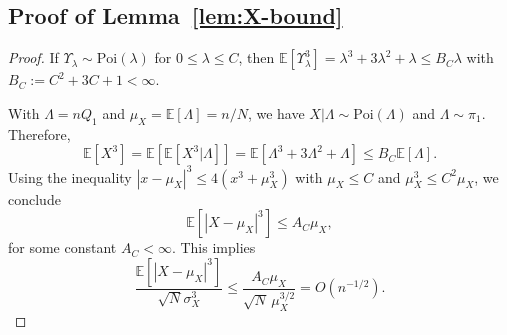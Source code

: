 \documentclass[11pt]{article}
\numberwithin{equation}{section}
\newcommand{\Pois}{\mathrm{Poi}}
\newcommand{\ex}[1]{\ensuremath{\mathbb{E}\left[ #1\right]}}
\begin{document}
\subsection{Proof of Lemma~\ref{lem:X-bound}}
\label{sec:proof-of-lem-X-bound}
\begin{proof}
If $\Upsilon_{\lambda}\sim\Pois(\lambda)$ for $0\le\lambda\le C$, then 
$\ex{\Upsilon_{\lambda}^3}=\lambda^3+3\lambda^2+\lambda\le B_C\lambda$ with $B_C := C^2+3C+1<\infty$. 

With $\Lambda = nQ_1$ and $\mu_X = \ex{\Lambda}=n/N$, we have $X | \Lambda \sim \Pois(\Lambda)$ and $\Lambda \sim \pi_1$. Therefore,
\[
\ex{X^3} = \ex{\ex{X^3 | \Lambda}} = \ex{\Lambda^3 + 3\Lambda^2 + \Lambda} \leq B_C\ex{\Lambda}.
\]
Using the inequality $|x-\mu_X|^3\le 4(x^3+\mu_X^3)$ with $\mu_X\le C$ and  $\mu_X^3\le C^2\mu_X$, we conclude
\[
\ex{|X-\mu_X|^3}\le A_C\mu_X,
\]
for some constant $A_C<\infty$. This implies
\[
    \frac{\ex{|X-\mu_X|^3}}{\sqrt{N} \sigma_X^3} \leq \frac{A_C\mu_X}{\sqrt{N}\,\mu_X^{3/2}} = O(n^{-1/2}).
\]
\end{proof}
\end{document}
